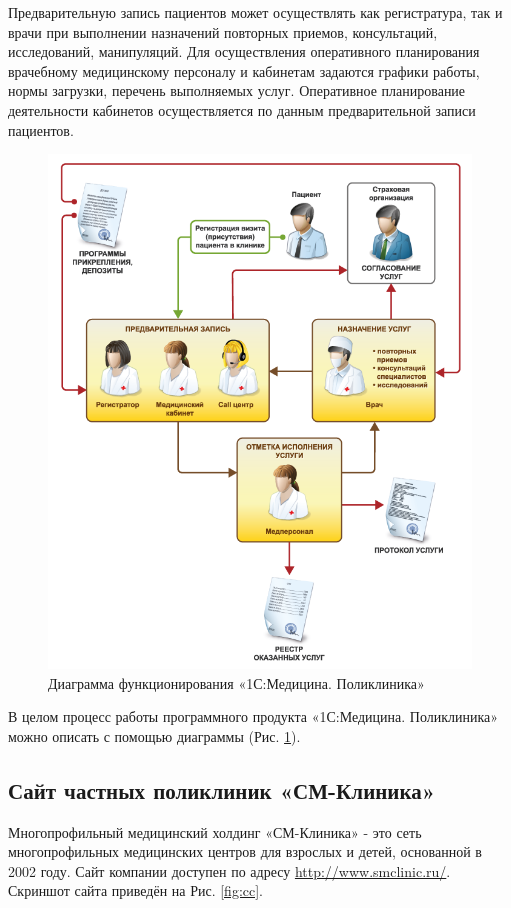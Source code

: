 \documentclass[14pt,a4paper,russian]{extreport}
\begin{document}
Предварительную запись пациентов может осуществлять как регистратура, так и врачи при выполнении
назначений повторных приемов, консультаций, исследований, манипуляций. Для осуществления
оперативного планирования врачебному медицинскому персоналу и кабинетам задаются графики работы,
нормы загрузки, перечень выполняемых услуг. Оперативное планирование деятельности кабинетов
осуществляется по данным предварительной записи пациентов.\cite{1cclinic}
\cleardoublepage
\begin{figure}[b!]
        \includegraphics[scale=0.9]{1cdiagram}
        \caption{Диаграмма функционирования «1С:Медицина. Поликлиника»}
        \label{fig:1cdiag}
\end{figure}

В целом процесс работы программного продукта «1С:Медицина. Поликлиника» можно описать с помощью
диаграммы (Рис. \ref{fig:1cdiag}).
\subsection{Сайт частных поликлиник «СМ-Клиника»}
Многопрофильный медицинский холдинг «СМ-Клиника»  - это сеть многопрофильных
медицинских центров для взрослых и детей, основанной в 2002 году.
Сайт компании доступен по адресу \url{http://www.smclinic.ru/}.
Скриншот сайта приведён на Рис. \ref{fig:cc}.\par
\end{document}
